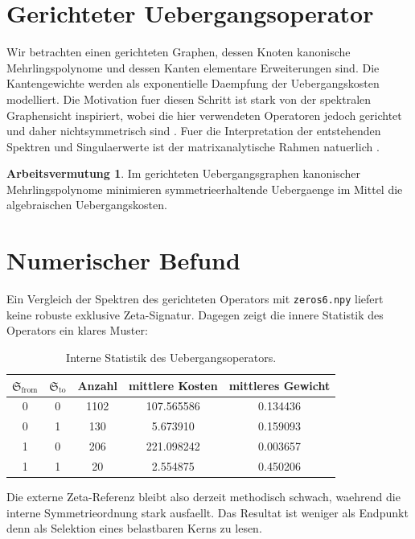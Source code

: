 \documentclass[11pt,a4paper]{article}
\theoremstyle{definition}
\newtheorem{arbeitsvermutung}[satz]{Arbeitsvermutung}
\begin{document}
\section{Gerichteter Uebergangsoperator}

Wir betrachten einen gerichteten Graphen, dessen Knoten kanonische Mehrlingspolynome und dessen Kanten elementare Erweiterungen sind. Die Kantengewichte werden als exponentielle Daempfung der Uebergangskosten modelliert. Die Motivation fuer diesen Schritt ist stark von der spektralen Graphensicht inspiriert, wobei die hier verwendeten Operatoren jedoch gerichtet und daher nichtsymmetrisch sind \cite{chung1997}. Fuer die Interpretation der entstehenden Spektren und Singulaerwerte ist der matrixanalytische Rahmen natuerlich \cite{hornjohnson2012}.

\begin{arbeitsvermutung}
Im gerichteten Uebergangsgraphen kanonischer Mehrlingspolynome minimieren symmetrieerhaltende Uebergaenge im Mittel die algebraischen Uebergangskosten.
\end{arbeitsvermutung}

\section{Numerischer Befund}

Ein Vergleich der Spektren des gerichteten Operators mit \texttt{zeros6.npy} liefert keine robuste exklusive Zeta-Signatur. Dagegen zeigt die innere Statistik des Operators ein klares Muster:

\begin{table}[h]
\centering
\begin{tabular}{ccccc}
\toprule
\(\mathfrak S_{\mathrm{from}}\) & \(\mathfrak S_{\mathrm{to}}\) & Anzahl & mittlere Kosten & mittleres Gewicht \\
\midrule
0 & 0 & 1102 & 107.565586 & 0.134436 \\
0 & 1 & 130  & 5.673910   & 0.159093 \\
1 & 0 & 206  & 221.098242 & 0.003657 \\
1 & 1 & 20   & 2.554875   & 0.450206 \\
\bottomrule
\end{tabular}
\caption{Interne Statistik des Uebergangsoperators.}
\end{table}

Die externe Zeta-Referenz bleibt also derzeit methodisch schwach, waehrend die interne Symmetrieordnung stark ausfaellt. Das Resultat ist weniger als Endpunkt denn als Selektion eines belastbaren Kerns zu lesen.
\end{document}
